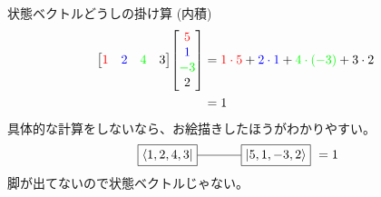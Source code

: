 \documentclass[dvipdfm]{beamer}
\begin{document}
\begin{frame}{状態ベクトルどうしの掛け算 (内積)}
    \begin{equation*}
        \begin{split}
            \mqty[\red{1} & \blue{2} & \green{4} & 3]
            \mqty[\red{5} \\ \blue{1} \\ \green{-3}\\ 2]
            &=
            \red{1\cdot5}
            +
            \blue{2\cdot1}
            +
            \green{4\cdot(-3)}
            +
            3\cdot2
            \\
            &=
            1
        \end{split}
    \end{equation*}
    具体的な計算をしないなら、お絵描きしたほうがわかりやすい。
    \begin{equation*}
        \vcenter{\hbox{
            \begin{tikzpicture}
                \node at(0,0)[draw,rectangle](ket){$\ket{5,1,-3,2}$};
                \node at(-3,0)[draw,rectangle](bra){$\bra{1,2,4,3}$};
                \draw(bra.east)--(ket.west);
            \end{tikzpicture}
        }}
        =
        1
    \end{equation*}
    脚が出てないので状態ベクトルじゃない。
\end{frame}




\end{document}
